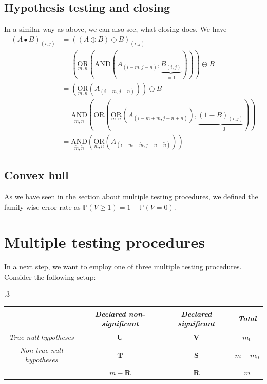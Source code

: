\documentclass[a4paper,12pt]{article}
\theoremstyle{plain}
\theoremstyle{definition}
\theoremstyle{remark}
\begin{document}
	\subsection{Hypothesis testing and closing}
	In a similar way as above, we can also see, what closing does. We have
	\begin{align*}
		(A \bullet B)_{(i, j)} &= ((A \oplus B) \ominus B)_{(i, j)} \\
		&= \left( \underset{m, n}{\mathrm{OR}} \left( \mathrm{AND} (A_{(i - m, j - n)}, \underbrace{B_{(i, j)}}_{= 1} ) \right) \right) \ominus B \\
		&= \left( \underset{m, n}{\mathrm{OR}} ( A_{(i - m, j - n)} ) \right) \ominus B \\
		&= \underset{\tilde{m}, \tilde{n}}{\mathrm{AND}} \left( \mathrm{OR} \left( \underset{m, n}{\mathrm{OR}} ( A_{(i - m + \tilde{m}, j - n + \tilde{n})} ), \underbrace{(1 - B)_{(i, j)}}_{= 0} \right) \right) \\
		&= \underset{\tilde{m}, \tilde{n}}{\mathrm{AND}} \left( \underset{m, n}{\mathrm{OR}} ( A_{(i - m + \tilde{m}, j - n + \tilde{n})} ) \right)
	\end{align*}
	
	\subsection{Convex hull}
	
	As we have seen in the section about multiple testing procedures, we defined the family-wise error rate as $\mathbb{P}(V \geq 1) = 1 - \mathbb{P}(V = 0)$.
	
	\newpage
	
	\section{Multiple testing procedures}
	
	In a next step, we want to employ one of three multiple testing procedures. Consider the following setup:
	\begin{table}[h]
		\tymax .3\textwidth
		\begin{tabulary}{\textwidth}{|CCCC|}
			\hline
			& \textit{Declared non-significant} & \textit{Declared significant} & \textit{Total} \\
			\hline
			\textit{True null hypotheses} & $\mathbf{U}$ & $\mathbf{V}$ & $m_0$ \\
			\textit{Non-true null hypotheses} & $\mathbf{T}$ & $\mathbf{S}$ & $m - m_0$ \\
			& $m - \mathbf{R}$ & $\mathbf{R}$ & $m$ \\
			\hline
		\end{tabulary}
	\end{table}
	
\end{document}

